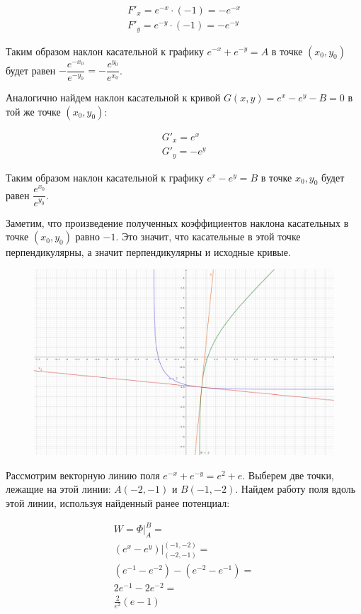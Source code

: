 \begin{equation*}\begin{split}
    F'_x = e^{-x} \cdot (-1) = -e^{-x} \\
    F'_y = e^{-y} \cdot (-1) = -e^{-y}
  \end{split}\end{equation*}

Таким образом наклон касательной к графику \(e^{-x} + e^{-y} = A\) в точке
\((x_0, y_0)\) будет равен
\(-\dfrac{e^{-x_0}}{e^{-y_0}} = -\dfrac{e^{y_0}}{e^{x_0}}\).

Аналогично найдем наклон касательной к кривой \(G(x, y) = e^x - e^y - B = 0\) в
той же точке \((x_0, y_0)\):

\begin{equation*}\begin{split}
    G'_x = e^x \\
    G'_y = -e^y
  \end{split}\end{equation*}

Таким образом наклон касательной к графику \(e^x - e^y = B\) в точке
\(x_0, y_0\) будет равен \(\dfrac{e^{x_0}}{e^{y_0}}\).

Заметим, что произведение полученных коэффициентов наклона касательных в точке
\((x_0, y_0)\) равно \(-1\). Это значит, что касательные в этой точке
перпендикулярны, а значит перпендикулярны и исходные кривые.

\begin{figure}[!htbp]
  \centering
  \includegraphics[width=\textwidth]{images/t02_p03.png}
\end{figure}

\bigskip

Рассмотрим векторную линию поля \(e^{-x} + e^{-y} = e^2 + e\). Выберем две
точки, лежащие на этой линии: \(A(-2, -1)\) и \(B(-1, -2)\). Найдем работу поля
вдоль этой линии, используя найденный ранее потенциал:

\begin{equation*}
  \begin{split}
    W = \Phi \bigg\vert_A^B = \\
    (e^x - e^y) \bigg\vert_{(-2, -1)}^{(-1, -2)} = \\
    (e^{-1} - e^{-2}) - (e^{-2} - e^{-1}) = \\
    2e^{-1} - 2e^{-2} = \\
    \frac{2}{e^2}(e - 1)
  \end{split}
\end{equation*}
